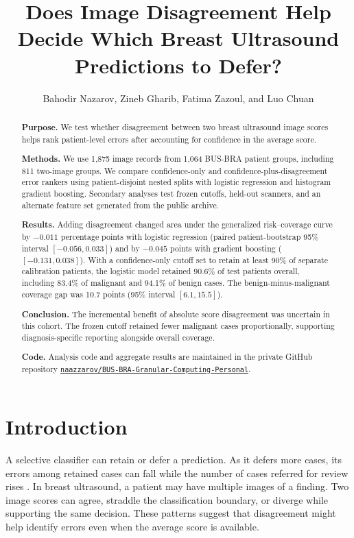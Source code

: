 \documentclass[11pt]{article}
\title{Does Image Disagreement Help Decide Which Breast Ultrasound Predictions to Defer?}
\author{Bahodir Nazarov, Zineb Gharib, Fatima Zazoul, and Luo Chuan}
\date{}
\newcommand{\studyrepo}{\href{https://github.com/naazzarov/BUS-BRA-Granular-Computing-Personal/tree/research/patient-deferral/research/patient_deferral}{\nolinkurl{naazzarov/BUS-BRA-Granular-Computing-Personal}}}
\begin{document}
\maketitle

\begin{abstract}
\textbf{Purpose.} We test whether disagreement between two breast ultrasound image scores helps rank patient-level errors after accounting for confidence in the average score.

\textbf{Methods.} We use 1,875 image records from 1,064 BUS-BRA patient groups, including 811 two-image groups. We compare confidence-only and confidence-plus-disagreement error rankers using patient-disjoint nested splits with logistic regression and histogram gradient boosting. Secondary analyses test frozen cutoffs, held-out scanners, and an alternate feature set generated from the public archive.

\textbf{Results.} Adding disagreement changed area under the generalized risk--coverage curve by $-0.011$ percentage points with logistic regression (paired patient-bootstrap 95\% interval $[-0.056,0.033]$) and by $-0.045$ points with gradient boosting ($[-0.131,0.038]$). With a confidence-only cutoff set to retain at least 90\% of separate calibration patients, the logistic model retained 90.6\% of test patients overall, including 83.4\% of malignant and 94.1\% of benign cases. The benign-minus-malignant coverage gap was 10.7 points (95\% interval $[6.1,15.5]$).

\textbf{Conclusion.} The incremental benefit of absolute score disagreement was uncertain in this cohort. The frozen cutoff retained fewer malignant cases proportionally, supporting diagnosis-specific reporting alongside overall coverage.

\textbf{Code.} Analysis code and aggregate results are maintained in the private GitHub repository \studyrepo.
\end{abstract}

\section{Introduction}
A selective classifier can retain or defer a prediction. As it defers more cases, its errors among retained cases can fall while the number of cases referred for review rises \cite{geifman}. In breast ultrasound, a patient may have multiple images of a finding. Two image scores can agree, straddle the classification boundary, or diverge while supporting the same decision. These patterns suggest that disagreement might help identify errors even when the average score is available.
\end{document}
